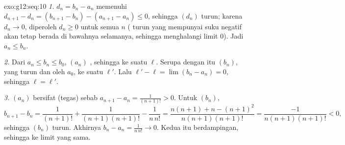 \begin{solution}{exo:g12:seq:10}
\emph{1.}  $d_n = b_n - a_n$ memenuhi
$d_{n+1} - d_n = (b_{n+1} - b_n) - (a_{n+1} - a_n) \leq 0$, sehingga $(d_n)$
turun; karena $d_n \to 0$, diperoleh $d_n \geq 0$ untuk semua $n$ (
turun yang mempunyai suku negatif akan tetap berada di bawahnya selamanya,
sehingga menghalangi limit $0$). Jadi $a_n \leq b_n$.

\emph{2.} Dari $a_n \leq b_n \leq b_0$,   $(a_n)$
, sehingga  ke suatu $\ell$. Serupa dengan itu
$(b_n)$, yang turun dan  oleh $a_0$,  ke suatu
$\ell'$. Lalu $\ell' - \ell = \lim (b_n - a_n) = 0$, sehingga $\ell = \ell'$.

\emph{3.} $(a_n)$ bersifat (tegas)  sebab
$a_{n+1} - a_n = \frac{1}{(n+1)!} > 0$. Untuk $(b_n)$,
\[
b_{n+1} - b_n = \frac{1}{(n+1)!} + \frac{1}{(n+1)(n+1)!} - \frac{1}{n\,n!}
= \frac{n(n+1) + n - (n+1)^2}{n(n+1)(n+1)!}
= \frac{-1}{n(n+1)(n+1)!} < 0 ,
\]
sehingga $(b_n)$ turun. Akhirnya $b_n - a_n = \frac{1}{n\,n!} \to 0$. Kedua
 itu berdampingan, sehingga  ke limit yang sama.
\end{solution}

